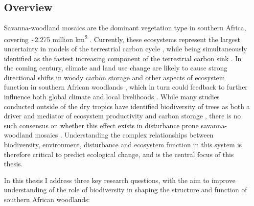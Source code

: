 \begin{refsection}


\chapter[\chaptertitle]{\chaptertitle}
\label{ch:intro}

\clearpage{}
\section{Overview}
\label{intro:sec:overview}

Savanna-woodland mosaics are the dominant vegetation type in southern Africa, covering \textasciitilde{}2.275 million km\textsuperscript{2} \citep{Arino2010}. Currently, these ecosystems represent the largest uncertainty in models of the terrestrial carbon cycle \citep{Ahlstrom2015}, while being simultaneously identified as the fastest increasing component of the terrestrial carbon sink \citep{Sitch2015}. In the coming century, climate and land use change are likely to cause strong directional shifts in woody carbon storage and other aspects of ecosystem function in southern African woodlands \citep{Midgley2011, Giannecchini2007, Scholze2006}, which in turn could feedback to further influence both global climate and local livelihoods \citep{Jew2016, Kalema2015}. While many studies conducted outside of the dry tropics have identified biodiversity of trees as both a driver and mediator of ecosystem productivity and carbon storage \citep{Liang2016}, there is no such consensus on whether this effect exists in disturbance prone savanna-woodland mosaics \citep{Mensah2020, Shirima2015a, McNicol2018a, Loiola2015}. Understanding the complex relationships between biodiversity, environment, disturbance and ecosystem function in this system is therefore critical to predict ecological change, and is the central focus of this thesis.

In this thesis I address three key research questions, with the aim to improve understanding of the role of biodiversity in shaping the structure and function of southern African woodlands:


\end{refsection}
